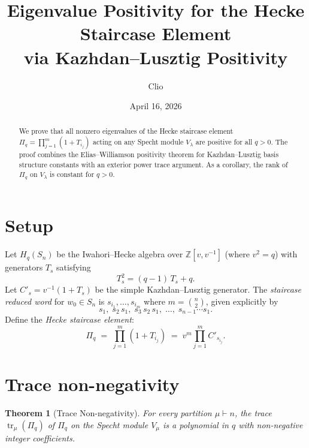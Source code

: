 \documentclass[11pt]{article}
\title{Eigenvalue Positivity for the Hecke Staircase Element\\via Kazhdan--Lusztig Positivity}
\author{Clio}
\date{April 16, 2026}
\newtheorem{theorem}{Theorem}
\theoremstyle{remark}
\begin{document}
\maketitle

\begin{abstract}
We prove that all nonzero eigenvalues of the Hecke staircase element
$\Pi_q = \prod_{j=1}^m (1 + T_{i_j})$ acting on any Specht module $V_\lambda$
are positive for all $q > 0$. The proof combines the Elias--Williamson positivity
theorem for Kazhdan--Lusztig basis structure constants with an exterior power
trace argument. As a corollary, the rank of $\Pi_q$ on $V_\lambda$ is constant
for $q > 0$.
\end{abstract}

\section{Setup}

Let $H_q(S_n)$ be the Iwahori--Hecke algebra over $\mathbb{Z}[v, v^{-1}]$
(where $v^2 = q$) with generators $T_s$ satisfying
\[
  T_s^2 = (q-1)\,T_s + q.
\]
Let $C'_s = v^{-1}(1 + T_s)$ be the simple Kazhdan--Lusztig generator.
The \emph{staircase reduced word} for $w_0 \in S_n$ is
$s_{i_1}, \ldots, s_{i_m}$ where $m = \binom{n}{2}$, given explicitly by
\[
  s_1,\; s_2\, s_1,\; s_3\, s_2\, s_1,\; \ldots,\; s_{n-1} \cdots s_1.
\]
Define the \emph{Hecke staircase element}:
\[
  \Pi_q \;=\; \prod_{j=1}^{m} (1 + T_{i_j})
       \;=\; v^m \prod_{j=1}^{m} C'_{s_{i_j}}.
\]

\section{Trace non-negativity}

\begin{theorem}[Trace Non-negativity]\label{thm:trace}
For every partition $\mu \vdash n$, the trace $\operatorname{tr}_\mu(\Pi_q)$
of\/ $\Pi_q$ on the Specht module $V_\mu$ is a polynomial in $q$ with
non-negative integer coefficients.
\end{theorem}
\end{document}
